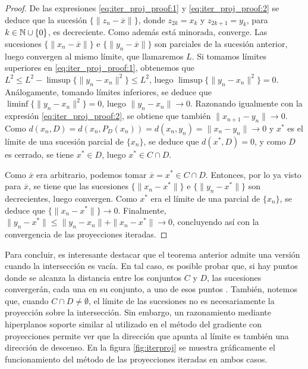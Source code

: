 \begin{proof}
    De las expresiones \ref{eq:iter_proj_proof:1} y \ref{eq:iter_proj_proof:2} se deduce que la sucesión $\{\|z_n - \overline{x}\|\}$, donde $z_{2k} = x_k$ y $z_{2k+1} = y_k$, para $k \in \mathbb{N} \cup\{0\}$, es decreciente. Como además está minorada, converge. Las sucesiones $\{\|x_n - \overline{x}\|\}$ e $\{\|y_n - \overline{x}\|\}$ son parciales de la sucesión anterior, luego convergen al mismo límite, que llamaremos $L$. Si tomamos límites superiores en \ref{eq:iter_proj_proof:1}, obtenemos que $L^2 \le L^2 - \limsup\{\|y_n - x_n\|^2\} \le L^2$, luego $\limsup\{\|y_n - x_n\|^2\} = 0$. Análogamente, tomando límites inferiores, se deduce que $\liminf\{\|y_n - x_n\|^2\} = 0$, luego $\|y_n - x_n \| \to 0$. Razonando igualmente con la expresión \ref{eq:iter_proj_proof:2}, se obtiene que también $\|x_{n+1} - y_n\| \to 0$. Como $d(x_n,D) = d(x_n,P_D(x_n)) = d(x_n,y_n) = \|x_n - y_n \| \to 0$ y $x^*$ es el límite de una sucesión parcial de $\{x_n\}$, se deduce que $d(x^*,D) = 0$, y como $D$ es cerrado, se tiene $x^* \in D$, luego $x^* \in C\cap D$.

    Como $\overline{x}$ era arbitrario, podemos tomar $\overline{x} = x^* \in C\cap D$. Entonces, por lo ya visto para $\overline{x}$, se tiene que las sucesiones $\{\|x_n - x^*\|\}$ e $\{\|y_n - x^*\|\}$ son decrecientes, luego convergen. Como $x^*$ era el límite de una parcial de $\{x_n\}$, se deduce que $\{\|x_n - x^*\|\} \to 0$. Finalmente, $\|y_n - x^*\| \le \|y_n - x_n\| + \|x_n - x^*\| \to 0$, concluyendo así con la convergencia de las proyecciones iteradas.

\end{proof}

Para concluir, es interesante destacar que el teorema anterior admite una versión cuando la intersección es vacía. En tal caso, es posible probar que, si hay puntos donde se alcanza la distancia entre los conjuntos $C$ y $D$, las sucesiones convergerán, cada una en su conjunto, a uno de esos puntos \cite{proximity_convex}. También, notemos que, cuando $C \cap D \ne \emptyset$, el límite de las sucesiones no es necesariamente la proyección sobre la intersección. Sin embargo, un razonamiento mediante hiperplanos soporte similar al utilizado en el método del gradiente con proyecciones permite ver que la dirección que apunta al límite es también una dirección de descenso. En la figura \ref{fig:iterproj} se muestra gráficamente el funcionamiento del método de las proyecciones iteradas en ambos casos.

